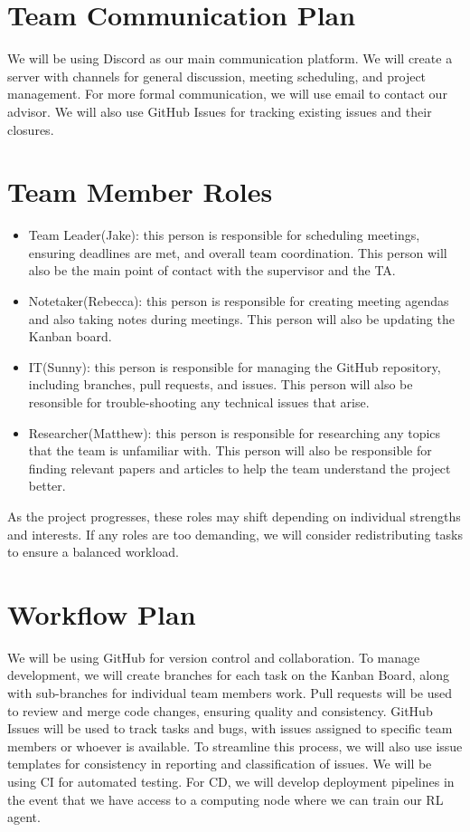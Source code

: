 \documentclass{article}
\begin{document}
\section{Team Communication Plan}

\raggedright
We will be using Discord as our main communication 
platform. We will create a server with channels for general 
discussion, meeting scheduling, and project management.
For more formal communication, we will use email to contact 
our advisor.
We will also use GitHub Issues for tracking existing 
issues and their closures.


\section{Team Member Roles}

\raggedright
\begin{itemize}
  \item Team Leader(Jake): this person is responsible for scheduling meetings,
    ensuring deadlines are met, and overall team coordination. This person will
    also be the main point of contact with the supervisor and the TA.
  \item Notetaker(Rebecca): this person is responsible for creating meeting agendas and also
    taking notes during meetings. This person will also be updating the Kanban
    board.
  \item IT(Sunny): this person is responsible for managing the GitHub repository, including
    branches, pull requests, and issues. This person will also be resonsible for trouble-shooting
    any technical issues that arise.
  \item Researcher(Matthew): this person is responsible for researching any topics that
    the team is unfamiliar with. This person will also be responsible for finding
    relevant papers and articles to help the team understand the project better.
\end{itemize}
As the project progresses, these roles may shift depending on individual strengths
and interests. If any roles are too demanding, we will consider redistributing tasks to
ensure a balanced workload.

\section{Workflow Plan}

\raggedright
We will be using GitHub for version control and collaboration.
To manage development, we will create branches for each task on the Kanban Board,
along with sub-branches for individual team members work. Pull requests 
will be used to review and merge code changes, ensuring quality and 
consistency. GitHub Issues will be used to track tasks and bugs, with 
issues assigned to specific team members or whoever is available.
To streamline this process, we will also use issue templates for 
consistency in reporting and classification of issues.  We will be
using CI for automated testing. For CD, we will develop deployment pipelines in the
event that we have access to a computing node where we can train our RL agent.
\end{document}
